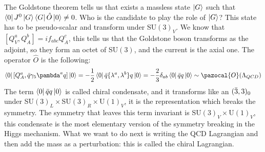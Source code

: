 \documentclass[../main.tex]{subfiles}
\begin{document}
The Goldstone theorem tells us that exists a massless state $\ket{G}$ such that $\bra{0}J^0\ket{G}\bra{G}\hat{O}\ket{0}\neq0$. Who is the candidate to play the role of $\ket{G}$? This state has to be pseudo-scalar and transform under SU$(3)_V$. We know that $[Q_V^a,Q_A^b]=if_{abc}Q_A^c$, this tells us that the Goldstone boson transforms as the adjoint, so they form an octet of SU$(3)$, and the current is the axial one. The operator $\hat{O}$ is the following:
\[
\bra{0}[Q_A^a,\Bar{q}\gamma_5\pambda^aq]\ket{0}=-\frac{1}{2}\bra{0}\Bar{q}\{\lambda^a,\lambda^b\}q\ket{0}=-\frac{2}{3}\delta_{ab}\bra{0}\Bar{q}q\ket{0}\sim\pazocal{O}(\Lambda_{QCD})
\]
The term $\bra{0}\Bar{q}q\ket{0}$ is called chiral condensate, and it transforms like an $(\Bar{3},3)_0$ under SU$(3)_L\times$SU$(3)_R\times$U$(1)_V$, it is the representation which breaks the symmetry. The symmetry that leaves this term invariant is SU$(3)_V\times$U$(1)_V$, this condensate is the most elementary version of the symmetry breaking in the Higgs mechanism. What we want to do next is writing the QCD Lagrangian and then add the mass as a perturbation: this is called the chiral Lagrangian.
\end{document}
